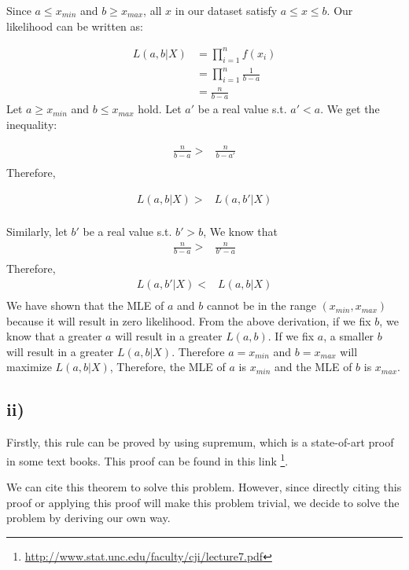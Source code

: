 \documentclass[twoside,11pt]{homework}
\begin{document}
Since $a \leq x_{min}$ and $b \geq x_{max}$, all $x$ in our dataset satisfy $a \leq x \leq b$. Our likelihood can be written as:

\begin{align*}
    L(a,b|X) &= \prod_{i=1}^n f(x_i) \\
    				&= \prod_{i=1}^n \frac{1}{b-a} \\
                    &= \frac{n}{b-a}
\end{align*}
Let $a \geq x_{min}$ and $b \leq x_{max}$ hold. Let $a'$ be a real value s.t. $a'<a$. We get the inequality: 

\begin{align*}
\frac{n}{b-a} >&\frac{n}{b-a'}  \\
\end{align*}
Therefore, 

\begin{align*}
L(a,b|X)  >& L(a,b'|X)   \\
\end{align*}

Similarly, let $b'$ be a real value s.t. $b'>b$, We know that
\begin{align*}
\frac{n}{b-a} > &\frac{n}{b'-a}  \\
\end{align*}
Therefore,
\begin{align*}
L(a,b'|X)  <& L(a,b|X)   \\
\end{align*}
We have shown that the MLE of $a$ and $b$ cannot be in the range $(x_{min}, x_{max})$ because it will result in zero likelihood. From the above derivation, if we fix $b$, we know that a greater $a$ will result in a greater $L(a, b)$. If we fix $a$,  a smaller $b$ will result in a greater $L(a,b|X) $. Therefore $a=x_{min}$ and $b=x_{max}$ will maximize $L(a,b|X)$, Therefore, the MLE of $a$  is $x_{min}$ and the MLE of $b$ is $x_{max}$. 

\newpage
\subsection*{ii)}

Firstly, this rule can be proved by using supremum, which is a state-of-art proof in some text books. This proof can be found in this link \footnote{\url{http://www.stat.unc.edu/faculty/cji/lecture7.pdf}}. 

We can cite this theorem to solve this problem. However, since directly citing this proof or applying this proof will make this problem trivial, we decide to solve the problem by deriving our own way.
\end{document}
